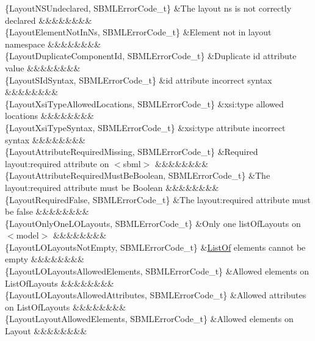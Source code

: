 \begin{DoxyParagraph}{}
\begin{longtabu}
\{Layout\+N\+S\+Undeclared, S\+B\+M\+L\+Error\+Code\+\_\+t\} &The layout ns is not correctly declared &&&&&&&&\\
\{Layout\+Element\+Not\+In\+Ns, S\+B\+M\+L\+Error\+Code\+\_\+t\} &Element not in layout namespace &&&&&&&&\\
\{Layout\+Duplicate\+Component\+Id, S\+B\+M\+L\+Error\+Code\+\_\+t\} &Duplicate \textquotesingle{}id\textquotesingle{} attribute value &&&&&&&&\\
\{Layout\+S\+Id\+Syntax, S\+B\+M\+L\+Error\+Code\+\_\+t\} &\textquotesingle{}id\textquotesingle{} attribute incorrect syntax &&&&&&&&\\
\{Layout\+Xsi\+Type\+Allowed\+Locations, S\+B\+M\+L\+Error\+Code\+\_\+t\} &\textquotesingle{}xsi\+:type\textquotesingle{} allowed locations &&&&&&&&\\
\{Layout\+Xsi\+Type\+Syntax, S\+B\+M\+L\+Error\+Code\+\_\+t\} &\textquotesingle{}xsi\+:type\textquotesingle{} attribute incorrect syntax &&&&&&&&\\
\{Layout\+Attribute\+Required\+Missing, S\+B\+M\+L\+Error\+Code\+\_\+t\} &Required layout\+:required attribute on {\ttfamily $<$sbml$>$} &&&&&&&&\\
\{Layout\+Attribute\+Required\+Must\+Be\+Boolean, S\+B\+M\+L\+Error\+Code\+\_\+t\} &The layout\+:required attribute must be Boolean &&&&&&&&\\
\{Layout\+Required\+False, S\+B\+M\+L\+Error\+Code\+\_\+t\} &The layout\+:required attribute must be \textquotesingle{}false\textquotesingle{} &&&&&&&&\\
\{Layout\+Only\+One\+L\+O\+Layouts, S\+B\+M\+L\+Error\+Code\+\_\+t\} &Only one list\+Of\+Layouts on {\ttfamily $<$model$>$} &&&&&&&&\\
\{Layout\+L\+O\+Layouts\+Not\+Empty, S\+B\+M\+L\+Error\+Code\+\_\+t\} &\hyperlink{class_list_of}{List\+Of} elements cannot be empty &&&&&&&&\\
\{Layout\+L\+O\+Layouts\+Allowed\+Elements, S\+B\+M\+L\+Error\+Code\+\_\+t\} &Allowed elements on List\+Of\+Layouts &&&&&&&&\\
\{Layout\+L\+O\+Layouts\+Allowed\+Attributes, S\+B\+M\+L\+Error\+Code\+\_\+t\} &Allowed attributes on List\+Of\+Layouts &&&&&&&&\\
\{Layout\+Layout\+Allowed\+Elements, S\+B\+M\+L\+Error\+Code\+\_\+t\} &Allowed elements on Layout &&&&&&&&\\

\end{longtabu}
\end{DoxyParagraph}
